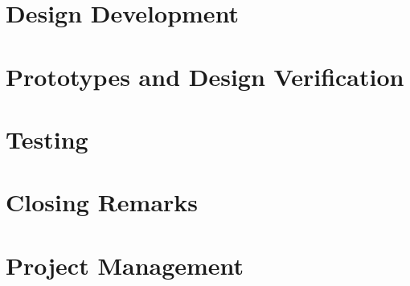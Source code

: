 \documentclass[en, screen, 12pt]{article}
\begin{document}








\section{Design Development}

\section{Prototypes and Design Verification}

\section{Testing}

\section{Closing Remarks}


\section{Project Management}

\appendix



\newpage
\printbibliography
\end{document}
